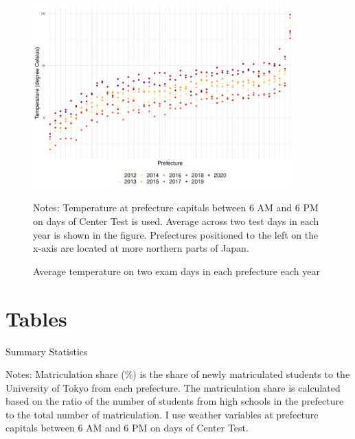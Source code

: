 \documentclass[12pt,letterpaper]{article}
\begin{document}
\begin{figure}[H]
  \centering
  \caption{Average temperature on two exam days in each prefecture each year}
  \includegraphics[width = 0.9\textwidth]{../Output/images/temperature_diff.pdf}
  \label{fig:temperature_diff}
  \footnotesize
  \begin{tablenotes}
    \item Notes:
      Temperature at prefecture capitals between 6 AM and 6 PM on days of Center Test is used.
      Average across two test days in each year is shown in the figure.
      Prefectures positioned to the left on the x-axis are located at more northern parts of Japan.
  \end{tablenotes}
\end{figure}

\section{Tables}

\begin{table}[H]
  \centering
  \caption{Summary Statistics}
  \resizebox{0.8\linewidth}{!}{
  
  }
  \label{tab:sum_stat}
  \footnotesize
  \begin{tablenotes}
    \item 
      Notes:
      Matriculation share (\%) is the share of newly matriculated students to the University of Tokyo from each prefecture.
      The matriculation share is calculated based on the ratio of the number of students from high schools in the prefecture to the total number of matriculation.
      I use weather variables at prefecture capitals between 6 AM and 6 PM on days of Center Test.
  \end{tablenotes}
\end{table}
\end{document}
